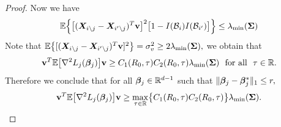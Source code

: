 \documentclass[twoside,11pt]{article}
\newcommand*{\BR}{\mathbb{R}}
\newcommand*{\bbetass}{\bbeta^*_{j}}
\begin{document}
\begin{proof}
Now we have 
$$
\mathbb{E} \Bigl \{ \bigl [(\bm{X}_{i\setminus j} - \bm{X}_{i' \setminus j})^T \mathbf{v} \bigr ]^2 \bigl[ 1- I(\mathcal{B}_{i})I(\mathcal{B}_{i'}) \bigr]\Bigr \} \leq \lambda_{\min}(\bm{\Sigma})
$$
Note that $\mathbb{E} \bigl \{ [(\bm{X}_{i\setminus j} - \bm{X}_{i' \setminus j})^T \mathbf{v} ]^2\bigr\}  = \sigma_v^2 \geq 2 \lambda_{\min}(\bm{\Sigma}),$
 we obtain that $$\vb^T \EE \bigl[  \nabla^2 L_j(\bbeta_j )\bigr] \vb \geq C_1(R_0,\tau) C_2(R_0,\tau)  \lambda_{\min} ( \bSigma)~~\text{for all}~~ \tau \in \BR.$$ Therefore we conclude that for all $\bbeta_j\in \BR^{d-1}$ such that $ \| \bbeta_j - \bbetass   \|_1 \leq r,$ 
 \begin{align}\label{equ::GGMlower}
 \vb^T \EE \bigl[\nabla^2 L_j(\bbeta_j )\bigl] \vb \geq \max _{\tau\in \BR}\bigl \{ C_1(R_0,\tau) C_2(R_0,\tau)  \bigr\} \lambda_{\min} ( \bSigma).
 \end{align}
 

\end{proof}
\end{document}
